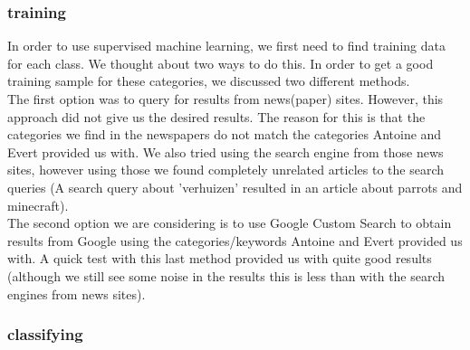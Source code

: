 \subsubsection{training}
In order to use supervised machine learning, we first need to find training data for each class. We thought about two ways to do this. In order to get a good training sample for these categories, we discussed two different methods. \\

The first option was to query for results from news(paper) sites. However, this approach did not give us the desired results. The reason for this is that the categories we find in the newspapers do not match the categories Antoine and Evert provided us with. We also tried using the search engine from those news sites, however using those we found completely unrelated articles to the search queries (A search query about 'verhuizen' resulted in an article about parrots and minecraft).\\

The second option we are considering is to use Google Custom Search to obtain results from Google using the categories/keywords Antoine and Evert provided us with. A quick test with this last method provided us with quite good results (although we still see some noise in the results this is less than with the search engines from news sites).\\


\subsubsection{classifying}



